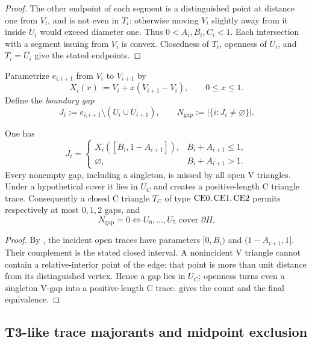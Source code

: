 \begin{proof}
The other endpoint of each segment is a distinguished point at distance
one from $V_i$, and is not even in $T_i$: otherwise moving $V_i$
slightly away from it inside $U_i$ would exceed diameter one.
Thus $0<A_i,B_i,C_i<1$. Each intersection with a segment issuing from
$V_i$ is convex.  Closedness of $T_i$, openness of $U_i$, and
$T_i=\overline{U_i}$ give the stated endpoints.
\end{proof}

Parametrize $e_{i,i+1}$ from $V_i$ to $V_{i+1}$ by
\[
 X_i(x):=V_i+x(V_{i+1}-V_i),\qquad 0\le x\le1.
\]
Define the \emph{boundary gap}
\[
 J_i:=e_{i,i+1}\setminus(U_i\cup U_{i+1}),\qquad
 N_{\mathrm{gap}}:=|\{i:J_i\ne\varnothing\}|.
\]

\begin{lemma}
\label{lem:gap-exhaustion}
One has
\[
 J_i=\begin{cases}
 X_i([B_i,1-A_{i+1}]),&B_i+A_{i+1}\le1,\\
 \varnothing,&B_i+A_{i+1}>1.
 \end{cases}
\]
Every nonempty gap, including a singleton, is missed by all open V triangles.
Under a hypothetical cover it lies in $U_C$ and creates a positive-length
C triangle trace.
Consequently a closed C triangle $T_C$ of type
$\mathrm{CE0},\mathrm{CE1},\mathrm{CE2}$ permits respectively at most $0,1,2$ gaps, and
\[
 N_{\mathrm{gap}}=0
 \iff U_0,\ldots,U_5\text{ cover }\partial H.
\]
\end{lemma}

\begin{proof}
By , the incident open traces have
parameters $[0,B_i)$ and $(1-A_{i+1},1]$. Their complement is the stated
closed interval.
A nonincident V triangle cannot contain a relative-interior point of the edge:
that point is more than unit distance from its distinguished vertex.  Hence a
gap lies in $U_C$; openness turns even a singleton V-gap into a
positive-length C trace.   gives the
count and the final equivalence.
\end{proof}



\subsection{T3-like trace majorants and midpoint exclusion}

